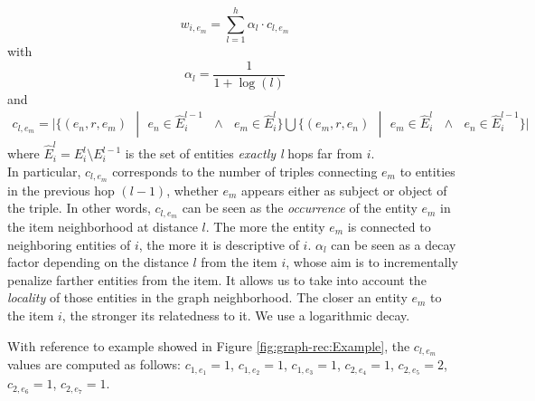 \[
w_{i,e_m}=\sum \limits_{l=1}^{h} {\alpha_l \cdot c_{l,e_m}}
\] 
with 
\[
\alpha_l =\frac{1}{1+\log(l)}
\]
and
\begin{multline}
c_{l,e_m} = \vert \lbrace  (e_n,r,e_m) \textit{  } | \textit{  } e_n \in \widehat{E}^{l-1}_i \textit{ } \wedge \textit{ } e_m \in \widehat{E}^l_i \rbrace 
 \bigcup \lbrace  (e_m,r,e_n) \textit{  } | \textit{  } e_m \in \widehat{E}^l_i  \textit{ } \wedge \textit{ }  e_n \in \widehat{E}^{l-1}_i \rbrace \vert \nonumber
\end{multline}
where $ \widehat{E}^l_i =  E^l_i \setminus E^{l-1}_i$ is the set of entities \textit{exactly l} hops far from $i$. 
\\In particular, $c_{l,e_m}$ corresponds to the number of triples connecting $e_m$ to entities in the previous hop \textit{$(l-1)$}, whether $e_m$ appears either as subject or object of the triple. In other words, $c_{l,e_m}$ can be seen as the \textit{occurrence} of the entity $e_m$ in the item neighborhood at distance $l$. 
The more the entity $e_m$ is connected to neighboring entities of $i$, the more it is descriptive of $i$. 
$\alpha_l$ can be seen as a decay factor depending on the distance $l$ from the item $i$, whose aim is to incrementally penalize farther entities from the item. It allows us to take into account the \textit{locality} of those entities in the graph neighborhood. The closer an entity $e_m$ to the item $i$, the stronger its relatedness to it. We use a logarithmic decay. 

With reference to example showed in Figure \ref{fig:graph-rec:Example}, the $c_{l,e_m}$ values are computed as follows: 
$c_{1,e_1} =1$, $c_{1,e_2} =1$, $c_{1,e_3} = 1$, $c_{2,e_4} = 1$, $c_{2,e_5} =2$, $c_{2,e_6} =1$, $c_{2,e_7} =1$.%

